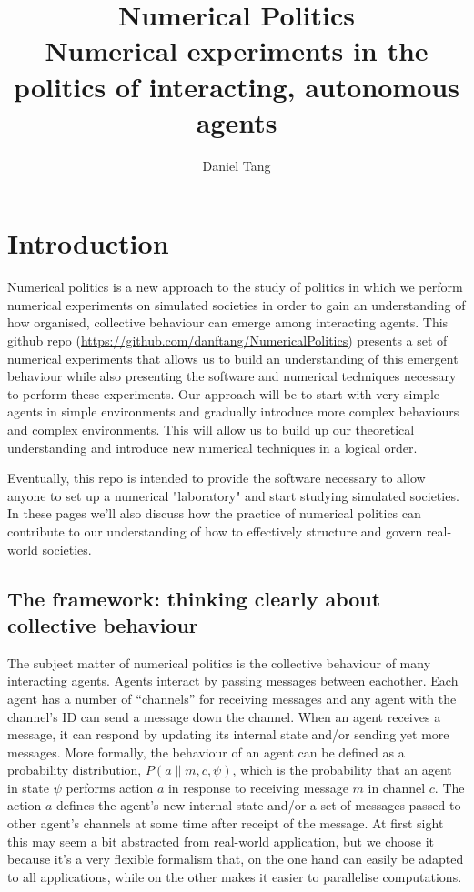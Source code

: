 \documentclass[a4paper]{report}
\title{Numerical Politics\\
	\large Numerical experiments in the politics of interacting, autonomous agents}
\author{Daniel Tang}
\begin{document}
\maketitle

\chapter{Introduction}

Numerical politics is a new approach to the study of politics in which we perform numerical experiments on simulated societies in order to gain an understanding of how organised, collective behaviour can emerge among interacting agents. This github repo (\url{https://github.com/danftang/NumericalPolitics}) presents a set of numerical experiments  that allows us to build an understanding of this emergent behaviour while also presenting the software and numerical techniques necessary to perform these experiments. Our approach will be to start with very simple agents in simple environments and gradually introduce more complex behaviours and complex environments. This will allow us to build up our theoretical understanding and introduce new numerical techniques in a logical order.

Eventually, this repo is intended to provide the software necessary to allow anyone to set up a numerical "laboratory" and start studying simulated societies. In these pages we'll also discuss how the practice of numerical politics can contribute to our understanding of how to effectively structure and govern real-world societies.

\section{The framework: thinking clearly about collective behaviour}

The subject matter of numerical politics is the collective behaviour of many interacting agents. Agents interact by passing messages between eachother. Each agent has a number of ``channels'' for receiving messages and any agent with the channel's ID can send a message down the channel. When an agent receives a message, it can respond by updating its internal state and/or sending yet more messages. More formally, the behaviour of an agent can be defined as a probability distribution, $P(a\|m,c,\psi)$, which is the probability that an agent in state $\psi$ performs action $a$ in response to receiving message $m$ in channel $c$. The action $a$ defines the agent's new internal state and/or a set of messages passed to other agent's channels at some time after receipt of the message. At first sight this may seem a bit abstracted from real-world application, but we choose it because it's a very flexible formalism that, on the one hand can easily be adapted to all applications, while on the other makes it easier to parallelise computations.
\end{document}
